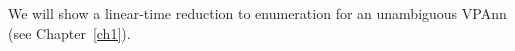 We will show a linear-time reduction to enumeration for an unambiguous VPAnn (see Chapter~\ref{ch1}).

%
%

%
%
%
%

